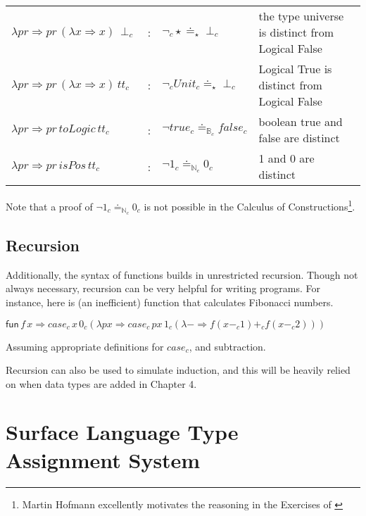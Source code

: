 \begin{tabular}{lcll}
  $\lambda pr\Rightarrow pr\,\left(\lambda x\Rightarrow x\right)\,\perp_{c}$ & : & $\lnot_{c}\star\doteq_{\star}\perp_{c}$ & the type universe is distinct from Logical False\tabularnewline
  $\lambda pr\Rightarrow pr\,\left(\lambda x\Rightarrow x\right)\,tt_{c}$ & : & $\lnot_{c}Unit_{c}\doteq_{\star}\perp_{c}$ & Logical True is distinct from Logical False\tabularnewline
  $\lambda pr\Rightarrow pr\,toLogic\,tt_{c}$ & : & $\lnot true_{c}\doteq_{\mathbb{B}_{c}}false_{c}$ & boolean true and false are distinct\tabularnewline
  $\lambda pr\Rightarrow pr\,isPos\,tt_{c}$ & : & $\lnot1_{c}\doteq_{\mathbb{N}_{c}}0_{c}$ & 1 and 0 are distinct\tabularnewline
  \end{tabular}
  


Note that a proof of $\lnot1_{c}\doteq_{\mathbb{N}_{c}}0_{c}$ is not possible in the Calculus of Constructions\cite{10.2307/2274575}\footnote{Martin Hofmann excellently motivates the reasoning in the Exercises of \cite{hofmann_1997}}.



\subsection{Recursion}

Additionally, the syntax of functions builds in unrestricted recursion.
Though not always necessary, recursion can be very helpful for writing programs.
For instance, here is (an inefficient) function that calculates Fibonacci numbers.

$\mathsf{fun}\,f\,x\Rightarrow case_{c}\,x\,0_{c}\left(\lambda px\Rightarrow case_{c}\,px\,1_{c}\left(\lambda-\Rightarrow f\left(x-_{c}1\right)+_{c}f\left(x-_{c}2\right)\right)\right)$

Assuming appropriate definitions for $case_{c}$, and subtraction.

Recursion can also be used to simulate induction, and this will be heavily relied on when data types are added in Chapter 4.


\section{Surface Language Type Assignment System}

